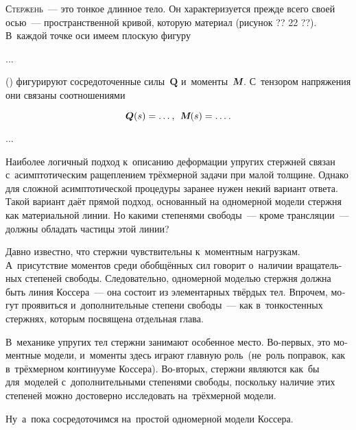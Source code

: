 \begin{otherlanguage}{russian}

\lettrine[lines=2, findent=2pt, nindent=0pt]{С}{тержень}~--- это тонкое длинное тело. Он характеризуется прежде всего своей осью~--- пространственной кривой, которую  материал (рисунок ?? 22 ??). В~каждой точке оси имеем плоскую фигуру

...

 () фигурируют сосредоточенные силы~$\bm{Q}$ и~моменты~$\mathboldM$. С~тензором напряжения они связаны соотношениями

\nopagebreak\vspace{-0.2em}\begin{equation}
\bm{Q}(s) = \ldots \hspace{.1ex} ,
\:\:
\mathboldM(s) = \ldots \hspace{.1ex} .
\end{equation}

...


Наиболее логичный подход к~описанию деформации упругих стержней связан с~асимптотическим ращеплением трёхмерной задачи при малой толщине. Однако для сложной асимптотической процедуры заранее нужен некий вариант ответа. Такой вариант даёт прямой подход, основанный на одномерной модели стержня как материальной линии. Но какими степенями свободы~--- кроме трансляции~--- должны обладать частицы этой линии?

Давно известно, что стержни чувствительны к~моментным нагрузкам. А~присутствие моментов среди обобщённых сил говорит о~наличии вращательных степеней свободы. Следовательно, одномерной моделью стержня должна быть линия Коссера~--- она состоит из элементарных твёрдых тел. Впрочем, могут проявиться и~дополнительные степени свободы~--- как в~тонкостенных стержнях, которым посвящена отдельная глава.

В~механике упругих тел стержни занимают особенное место. Во\hbox{-}первых, это моментные модели, и~моменты здесь играют главную роль~(не~роль поправок, как в~трёхмерном континууме Коссера). Во\hbox{-}вторых, стержни являются как~бы  для~моделей с~дополнительными степенями свободы, поскольку наличие этих степеней можно достоверно исследовать на~трёх\-мерной модели.

Ну~а~пока сосредоточимся на~простой одномерной модели Коссера.



\end{otherlanguage}

